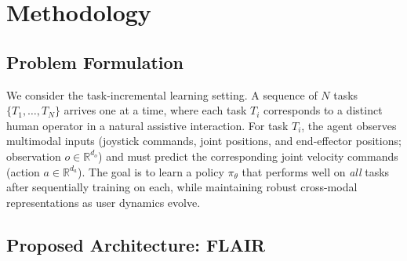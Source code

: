 \documentclass[3p,times,procedia]{elsarticle}
\begin{document}



\section{Methodology}
\subsection{Problem Formulation}

We consider the task-incremental learning setting. A sequence of $N$ tasks $\{T_1, \ldots, T_N\}$ arrives one at a time, where each task $T_i$ corresponds to a distinct human operator in a natural assistive interaction. For task $T_i$, the agent observes multimodal inputs (joystick commands, joint positions, and end-effector positions; observation $o \in \mathbb{R}^{d_o}$) and must predict the corresponding joint velocity commands (action $a \in \mathbb{R}^{d_a}$). The goal is to learn a policy $\pi_\theta$ that performs well on \emph{all} tasks after sequentially training on each, while maintaining robust cross-modal representations as user dynamics evolve.

\subsection{Proposed Architecture: FLAIR}
\end{document}
